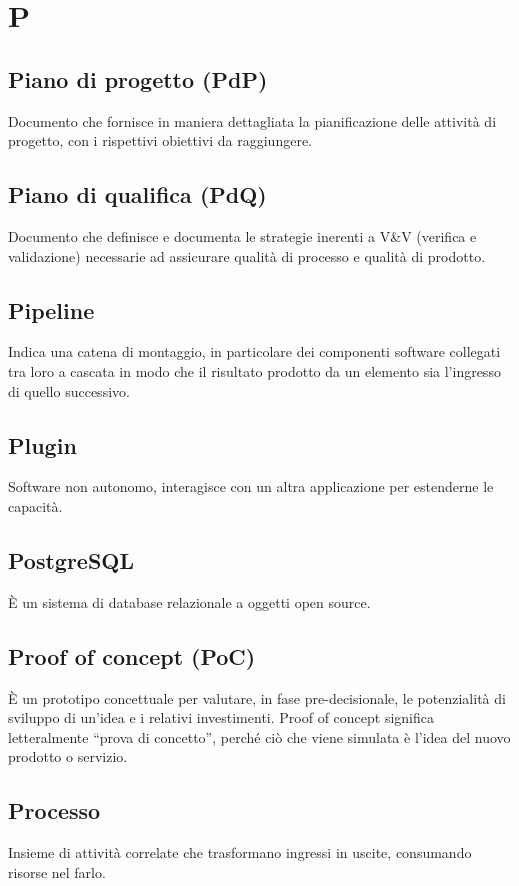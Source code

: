 \documentclass{classes/base}
\begin{document}
    \section{P}
        \subsection*{Piano di progetto (PdP)}
        Documento che fornisce in maniera dettagliata la pianificazione delle attività di progetto, con i rispettivi obiettivi da raggiungere. 

        \subsection*{Piano di qualifica (PdQ)} 
        Documento che definisce e documenta le strategie inerenti a V\&V (verifica e validazione) necessarie ad assicurare qualità di processo e qualità di prodotto.

        \subsection*{Pipeline}
        Indica una catena di montaggio, in particolare dei componenti software collegati tra loro a cascata in modo che il risultato prodotto da un elemento sia l'ingresso di quello successivo.

        \subsection*{Plugin}
        Software non autonomo, interagisce con un altra applicazione per estenderne le capacità.

        \subsection*{PostgreSQL}
        È un sistema di database relazionale a oggetti open source.

        \subsection*{Proof of concept (PoC)}
        È un prototipo concettuale per valutare, in fase pre-decisionale, le potenzialità di sviluppo di un’idea e i relativi investimenti. Proof of concept significa letteralmente “prova di concetto”, perché ciò che viene simulata è l’idea del nuovo prodotto o servizio.
        
        \subsection*{Processo}
        Insieme di attività correlate che trasformano ingressi in uscite, consumando risorse nel farlo.
        
\end{document}
